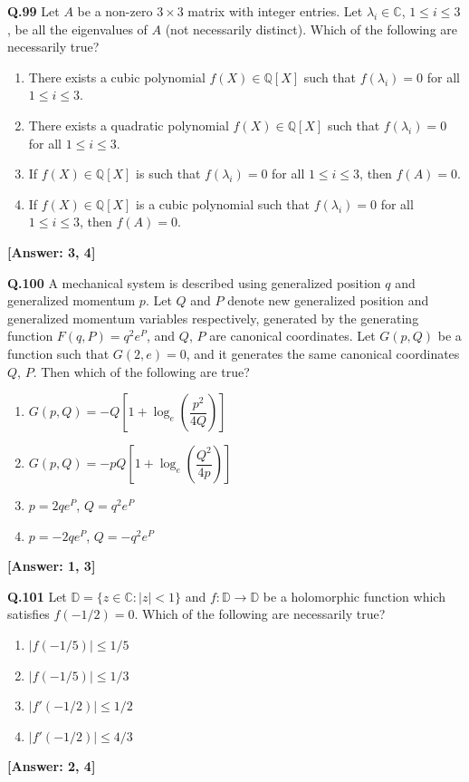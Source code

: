 \documentclass[12pt,a4paper]{article}
\newcommand{\ans}[1]{\quad\textcolor{anscolor}{\textbf{[Answer: #1]}}}
\begin{document}
\textbf{Q.99} Let $A$ be a non-zero $3\times3$ matrix with integer entries. Let $\lambda_i\in\mathbb{C}$, $1\le i\le3$, be all the eigenvalues of $A$ (not necessarily distinct). Which of the following are necessarily true?
\begin{enumerate}[label=\arabic*.]
\item There exists a cubic polynomial $f(X)\in\mathbb{Q}[X]$ such that $f(\lambda_i)=0$ for all $1\le i\le3$.
\item There exists a quadratic polynomial $f(X)\in\mathbb{Q}[X]$ such that $f(\lambda_i)=0$ for all $1\le i\le3$.
\item If $f(X)\in\mathbb{Q}[X]$ is such that $f(\lambda_i)=0$ for all $1\le i\le3$, then $f(A)=0$.
\item If $f(X)\in\mathbb{Q}[X]$ is a cubic polynomial such that $f(\lambda_i)=0$ for all $1\le i\le3$, then $f(A)=0$.
\end{enumerate}\ans{3, 4}

\textbf{Q.100} A mechanical system is described using generalized position $q$ and generalized momentum $p$. Let $Q$ and $P$ denote new generalized position and generalized momentum variables respectively, generated by the generating function $F(q,P)=q^2e^P$, and $Q$, $P$ are canonical coordinates. Let $G(p,Q)$ be a function such that $G(2,e)=0$, and it generates the same canonical coordinates $Q$, $P$. Then which of the following are true?
\begin{enumerate}[label=\arabic*.]
\item $G(p,Q)=-Q\!\left[1+\log_e\!\left(\dfrac{p^2}{4Q}\right)\right]$
\item $G(p,Q)=-pQ\!\left[1+\log_e\!\left(\dfrac{Q^2}{4p}\right)\right]$
\item $p=2qe^P$, $Q=q^2e^P$ \item $p=-2qe^P$, $Q=-q^2e^P$
\end{enumerate}\ans{1, 3}

\textbf{Q.101} Let $\mathbb{D}=\{z\in\mathbb{C}:|z|<1\}$ and $f:\mathbb{D}\to\mathbb{D}$ be a holomorphic function which satisfies $f(-1/2)=0$. Which of the following are necessarily true?
\begin{enumerate}[label=\arabic*.]
\item $|f(-1/5)|\le1/5$ \item $|f(-1/5)|\le1/3$
\item $|f'(-1/2)|\le1/2$ \item $|f'(-1/2)|\le4/3$
\end{enumerate}\ans{2, 4}
\end{document}
